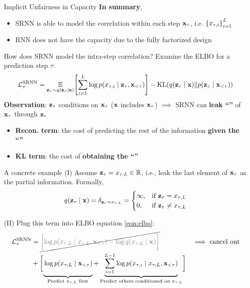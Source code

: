 \documentclass[final]{beamer}
\newlength{\colwidth}
\begin{document}
\begin{frame}[t]
\begin{columns}[t]
\begin{column}{\colwidth}
\begin{block}{Implicit Unfairness in Capacity}
 	\textbf{In summary},
 	\begin{itemize}
 	\item SRNN is able to model the correlation within each step ${\mathbf{x}}_\tau$, i.e. $\left\{ {x_{\tau,i}} \right\}_{i=1}^{L}$
 	\item RNN does not have the capacity due to the fully factorized design
 	\end{itemize}
\end{block}

\begin{block}{How does SRNN model the intra-step correlation?}
	Examine the ELBO for a prediction step $\tau$:
	\begin{equation}\label{eqn:elbo}
		\mc{L}^\text{SRNN}_\tau = \E_{\rvz_\tau \sim q(\rvz_{\tau} \mid \rvx)} \sbr{ \sum_{i=1}^{L} \log p(x_{\tau,i} \mid \rvz_\tau, \rvx_{<\tau}) } - \text{KL}\rbr{q(\rvz_{\tau} \mid \rvx) \| p(\rvz_{\tau} \mid \rvx_{<\tau})}
	\end{equation}
	\textbf{Observation}: ${\mathbf{z}}_{\tau}$ conditions on ${\mathbf{x}}_\tau$ (${\mathbf{x}}$ includes ${\mathbf{x}}_\tau$) $\implies$ SRNN can \textbf{leak ``''} of ${\mathbf{x}}_{\tau}$ through ${\mathbf{z}}_{\tau}$
	\begin{itemize}
		\item \textbf{Recon. term}: the cost of predicting the rest of the information \textbf{given the ``''}
		\item \textbf{KL term}: the cost of \textbf{obtaining the ``''}
	\end{itemize} 
\end{block}

\begin{alertblock}{A concrete example}
 	(I) Assume ${\mathbf{z}}_{\tau} = x_{\tau, L} \in \mathbb{R}$, i.e., leak the last element of ${\mathbf{x}}_{\tau}$ as the partial information. Formally,
 	\[ q({\mathbf{z}}_{\tau} \mid {\mathbf{x}}) = \delta_{{\mathbf{z}}_{\tau} = x_{\tau, L}} = 
 	\begin{cases}
 	\infty, & \text{if ${\mathbf{z}}_{\tau} = x_{\tau, L}$} \\
 	0, &\text{if ${\mathbf{z}}_{\tau} \neq x_{\tau, L}$} \\
 	\end{cases} 
 	\]
 	
 	(II) Plug this term into ELBO equation \eqref{eqn:elbo}:
 	\begin{align*}
 	\mc{L}^\text{SRNN}_\tau
 	&= \cancel{ \gray{ \sbr[\bigg]{ \log p(x_{\tau,L} \mid x_{\tau,L}, \rvx_{<\tau}) - \log q(x_{\tau,L} \mid \rvx) } } } && \text{$\implies$ cancel out} \\
 	&+ \sbr[\bigg]{ 
 		\underbrace{\vphantom{\sum_{i=1}^{L-1}} \log p(x_{\tau,L} \mid \rvx_{<\tau})}_\text{Predict $x_{\tau,L}$ first} + 
 		\underbrace{\sum_{i=1}^{L-1} \log p(x_{\tau,i} \mid x_{\tau,L}, \rvx_{<\tau}) }_\text{Predict others conditioned on $x_{\tau,L}$}}
 	\end{align*}
 	

\end{alertblock}
\end{column}
\end{columns}
\end{frame}
\end{document}
